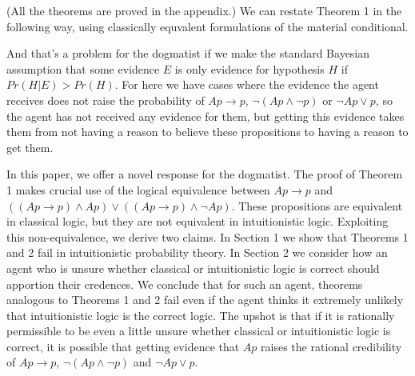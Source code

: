 \TheoremOne

\noindent (All the theorems are proved in the appendix.) We can restate Theorem 1 in the following way, using classically equvalent formulations of the material conditional.

\TheoremTwo

\noindent And that's a problem for the dogmatist if we make the standard Bayesian assumption that some evidence $E$ is only evidence for hypothesis $H$ if $Pr(H | E) >  Pr(H)$. For here we have cases where the evidence the agent receives does not raise the probability of $Ap \rightarrow p$, $\neg(Ap \wedge \neg p)$ or $\neg Ap \vee p$, so the agent has not received any evidence for them, but getting this evidence takes them from not having a reason to believe these propositions to having a reason to get them.

In this paper, we offer a novel response for the dogmatist. The proof of Theorem 1 makes crucial use of the logical equivalence between $Ap \rightarrow p$ and $((Ap \rightarrow p) \wedge Ap) \vee ((Ap \rightarrow p) \wedge \neg Ap)$. These propositions are equivalent in classical logic, but they are not equivalent in intuitionistic logic. Exploiting this non-equivalence, we derive two claims. In Section 1 we show that Theorems 1 and 2 fail in intuitionistic probability theory. In Section 2 we consider how an agent who is unsure whether classical or intuitionistic logic is correct should apportion their credences. We conclude that for such an agent, theorems analogous to Theorems 1 and 2 fail even if the agent thinks it extremely unlikely that intuitionistic logic is the correct logic. The upshot is that if it is rationally permissible to be even a little unsure whether classical or intuitionistic logic is correct, it is possible that getting evidence that $Ap$ raises the rational credibility of $Ap \rightarrow p$, $\neg(Ap \wedge \neg p)$ and $\neg Ap \vee p$.

